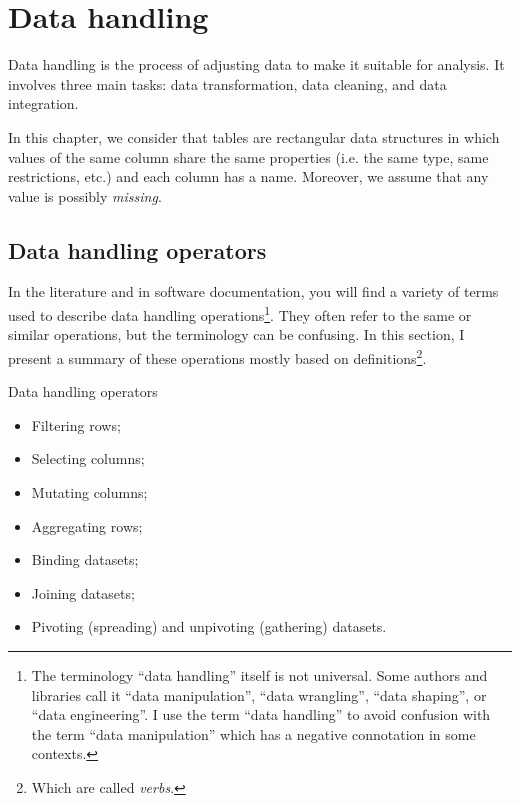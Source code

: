 \chapter{Data handling}
\label{chap:handling}



Data handling is the process of adjusting data to make it suitable for analysis.
It involves three main tasks: data transformation, data cleaning, and data integration.

In this chapter, we consider that tables are rectangular data structures in which values
of the same column share the same properties (i.e. the same type, same restrictions, etc.)
and each column has a name.  Moreover, we assume that any value is possibly
\emph{missing}.

\section{Data handling operators}

In the literature and in software documentation, you will find a variety of terms used to
describe data handling operations\footnote{%
  The terminology ``data handling'' itself is not universal.  Some authors and libraries
  call it ``data manipulation'', ``data wrangling'', ``data shaping'', or ``data
  engineering''.  I use the term ``data handling'' to avoid confusion with the term ``data
  manipulation'' which has a negative connotation in some contexts.}. %
They often refer to the same or similar operations, but the terminology can be confusing.
In this section, I present a summary of these operations mostly based on
\textcite{Wickham2023} definitions\footnote{Which are called \emph{verbs}.}.

\begin{slidebox}{Data handling operators}{}
  \begin{itemize}
    \item Filtering rows;
    \item Selecting columns;
    \item Mutating columns;
    \item Aggregating rows;
    \item Binding datasets;
    \item Joining datasets;
    \item Pivoting (spreading) and unpivoting (gathering) datasets.
  \end{itemize}
\end{slidebox}

